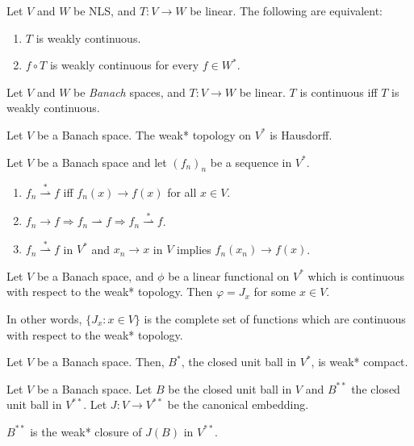 \documentclass[12pt]{article}	%
\newcommand{\weak}{\rightharpoonup}
\newcommand{\weaks}{\overset{\ast}{\weak}}
\begin{document}
\begin{thm}
	Let $V$ and $W$ be NLS, and $T : V \to W$ be linear. The following are equivalent:
	\begin{enumerate}
		\item $T$ is weakly continuous.
		\item $f \circ T$ is weakly continuous for every $f \in W^{\ast}$.
	\end{enumerate}
\end{thm}

\begin{thm}
	Let $V$ and $W$ be \emph{Banach} spaces, and $T : V \to W$ be linear. $T$ is continuous iff $T$ is weakly continuous.
\end{thm}

\begin{prop}
	Let $V$ be a Banach space. The weak* topology on $V^{\ast}$ is Hausdorff.
\end{prop}

\begin{prop}
	Let $V$ be a Banach space and let $(f_{n})_{n}$ be a sequence in $V^{\ast}$.
	\begin{enumerate}
		\item $f_{n} \weaks f$ iff $f_{n}(x) \to f(x)$ for all $x \in V$.
		\item $f_{n} \to f \Rightarrow f_{n} \weak f \Rightarrow f_{n} \weaks f$.
		\item $f_{n} \weaks f$ in $V^{\ast}$ and $x_{n} \to x$ in $V$ implies $f_{n}(x_{n}) \to f(x)$.
	\end{enumerate}
\end{prop}

\begin{prop}
	Let $V$ be a Banach space, and $\phi$ be a linear functional on $V^{\ast}$ which is continuous with respect to the weak* topology. Then $\varphi = J_{x}$ for some $x \in V$.

	In other words, $\{J_{x} : x \in V\}$ is the complete set of functions which are continuous with respect to the weak* topology.
\end{prop}

\begin{thm}
	Let $V$ be a Banach space. Then, $B^{\ast}$, the closed unit ball in $V^{\ast}$, is weak* compact.
\end{thm}

\begin{thm}
	Let $V$ be a Banach space. Let $B$ be the closed unit ball in $V$ and $B^{\ast \ast}$ the closed unit ball in $V^{\ast \ast}$. Let $J : V \to V^{\ast \ast}$ be the canonical embedding. 

	$B^{\ast \ast}$ is the weak* closure of $J(B)$ in $V^{\ast \ast}$.
\end{thm}
\end{document}
